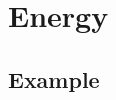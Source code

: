 \documentclass{article}
\begin{document}
\newcommand{\hr}{\par\noindent\rule{\textwidth}{0.4pt}}

\newcommand{\bc}[1]{
	\begin{equation*}
		\begin{boxed}
			{#1}
		\end{boxed}
	\end{equation*}
}

\newcommand{\cond}[2]{
	\ifmmode
		{#1} \quad {#2}
	\else
		$$ {#1} \quad {#2} $$
	\fi
}

\tableofcontents

\section{Energy}

\subsection{Example}
\end{document}
